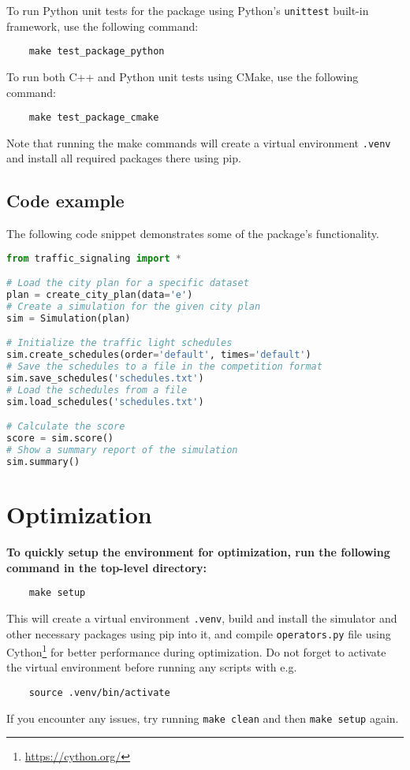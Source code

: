 \bigskip

To run Python unit tests for the package using Python's \verb|unittest| built-in framework, use the following command:
\begin{verbatim}
    make test_package_python
\end{verbatim}
To run both C++ and Python unit tests using CMake, use the following command:
\begin{verbatim}
    make test_package_cmake
\end{verbatim}
Note that running the make commands will create a virtual environment \verb|.venv| and install all required packages there using pip.

\subsection{Code example}

The following code snippet demonstrates some of the package's functionality. 

\begin{lstlisting}[language=Python]
from traffic_signaling import *

# Load the city plan for a specific dataset
plan = create_city_plan(data='e')
# Create a simulation for the given city plan
sim = Simulation(plan)

# Initialize the traffic light schedules
sim.create_schedules(order='default', times='default')
# Save the schedules to a file in the competition format
sim.save_schedules('schedules.txt')
# Load the schedules from a file
sim.load_schedules('schedules.txt')

# Calculate the score
score = sim.score()
# Show a summary report of the simulation
sim.summary()
\end{lstlisting}

\bigskip

\section{Optimization}

\textbf{To quickly setup the environment for optimization, run the following command in the top-level directory:}
\begin{verbatim}
    make setup
\end{verbatim}
This will create a virtual environment \verb|.venv|, build and install the simulator and other necessary packages using pip into it, and compile \verb|operators.py| file using Cython\footnote{\url{https://cython.org/}} for better performance during optimization. Do not forget to activate the virtual environment before running any scripts with e.g.
\begin{verbatim}
    source .venv/bin/activate
\end{verbatim}
If you encounter any issues, try running \verb|make clean| and then \verb|make setup| again.


